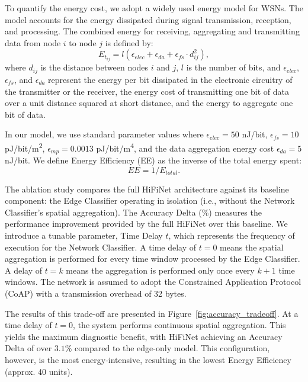 To quantify the energy cost, we adopt a widely used energy model for WSNs. The model accounts for the energy dissipated during signal transmission, reception, and processing. The combined energy for receiving, aggregating and transmitting data from node \(i\) to node \(j\) is defined by:
\begin{equation}
  E_{t_{ij}} = l (\epsilon_{elec} + \epsilon_{da} + \epsilon_{fs} \cdot d^2_{ij}),
\end{equation}
where \(d_{ij}\) is the distance between nodes \(i\) and \(j\), \(l\) is the number of bits, and \(\epsilon_{elec}\), \(\epsilon_{fs}\), and \(\epsilon_{da}\) represent the energy per bit dissipated in the electronic circuitry of the transmitter or the receiver, the energy cost of transmitting one bit of data over a unit distance squared at short distance, and the energy to aggregate one bit of data.

In our model, we use standard parameter values where \(\epsilon_{elec} = 50\) \si{nJ/bit}, \(\epsilon_{fs} = 10\) \si{pJ/bit/m^2}, \(\epsilon_{mp} = 0.0013\) \si{pJ/bit/m^4}, and the data aggregation energy cost \(\epsilon_{da} = 5 \) \si{nJ/bit}. We define Energy Efficiency (EE) as the inverse of the total energy spent:
\begin{equation}
  EE = 1 / E_{total}.
\end{equation}

The ablation study compares the full HiFiNet architecture against its baseline component: the Edge Classifier operating in isolation (i.e., without the Network Classifier's spatial aggregation). The Accuracy Delta (\%) measures the performance improvement provided by the full HiFiNet over this baseline. We introduce a tunable parameter, Time Delay \(t\), which represents the frequency of execution for the Network Classifier. A time delay of \(t=0\) means the spatial aggregation is performed for every time window processed by the Edge Classifier. A delay of \(t=k\) means the aggregation is performed only once every \(k+1\) time windows. The network is assumed to adopt the Constrained Application Protocol (CoAP) with a transmission overhead of 32 bytes.

The results of this trade-off are presented in Figure~\ref{fig:accuracy_tradeoff}. At a time delay of \(t=0\), the system performs continuous spatial aggregation. This yields the maximum diagnostic benefit, with HiFiNet achieving an Accuracy Delta of over \(3.1\%\) compared to the edge-only model. This configuration, however, is the most energy-intensive, resulting in the lowest Energy Efficiency (approx. 40 units).

